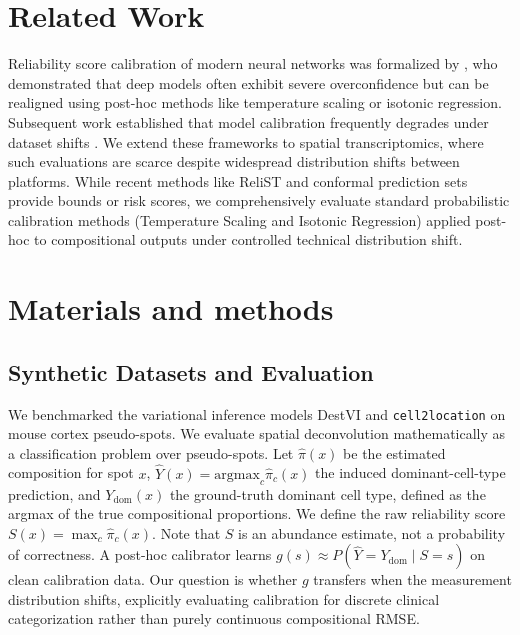 \documentclass{jmlr} %
\begin{document}
\section{Related Work}
\label{sec:related}
Reliability score calibration of modern neural networks was formalized by \citet{guo2017calibration}, who demonstrated that deep models often exhibit severe overconfidence but can be realigned using post-hoc methods like temperature scaling or isotonic regression. Subsequent work established that model calibration frequently degrades under dataset shifts \citep{ovadia2019can}. We extend these frameworks to spatial transcriptomics, where such evaluations are scarce despite widespread distribution shifts between platforms. While recent methods like ReliST \citep{relist2026} and conformal prediction sets \citep{corbetta2024conformal} provide bounds or risk scores, we comprehensively evaluate standard probabilistic calibration methods (Temperature Scaling and Isotonic Regression) applied post-hoc to compositional outputs under controlled technical distribution shift.

\section{Materials and methods}
\label{sec:methods}
\subsection{Synthetic Datasets and Evaluation}
We benchmarked the variational inference models DestVI and \texttt{cell2location} on mouse cortex pseudo-spots. We evaluate spatial deconvolution mathematically as a classification problem over pseudo-spots. Let $\hat{\pi}(x)$ be the estimated composition for spot $x$, $\hat{Y}(x) = \text{argmax}_c \hat{\pi}_c(x)$ the induced dominant-cell-type prediction, and $Y_{\text{dom}}(x)$ the ground-truth dominant cell type, defined as the argmax of the true compositional proportions. We define the raw reliability score $S(x) = \max_c \hat{\pi}_c(x)$. Note that $S$ is an abundance estimate, not a probability of correctness. A post-hoc calibrator learns $g(s) \approx P(\hat{Y} = Y_{\text{dom}} \mid S = s)$ on clean calibration data. Our question is whether $g$ transfers when the measurement distribution shifts, explicitly evaluating calibration for discrete clinical categorization rather than purely continuous compositional RMSE.
\end{document}
